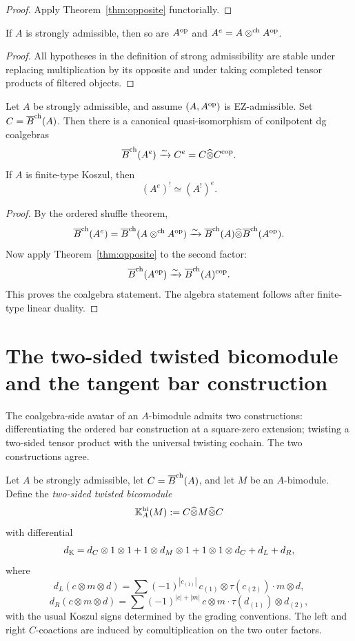 \begin{proof}
Apply Theorem~\ref{thm:opposite} functorially.
\end{proof}

\begin{lemma}
\label{lem:closure}
If $A$ is strongly admissible, then so are $A^{\mathrm{op}}$ and $A^e=A\mathbin{\otimes^{\mathrm{ch}}} A^{\mathrm{op}}$.
\end{lemma}

\begin{proof}
All hypotheses in the definition of strong admissibility are stable under replacing multiplication by
its opposite and under taking completed tensor products of filtered objects.
\end{proof}

\begin{corollary}
\label{cor:enveloping}
Let $A$ be strongly admissible, and assume $(A,A^{\mathrm{op}})$ is EZ-admissible. Set $C=\overline{B}^{\mathrm{ch}}(A)$.
Then there is a canonical quasi-isomorphism of conilpotent dg coalgebras
\[
\overline{B}^{\mathrm{ch}}(A^e)\xrightarrow{\sim} C^e=C\widehat\otimes C^{\mathrm{cop}}.
\]
If $A$ is finite-type Koszul, then
\[
(A^e)^!\simeq (A^!)^e.
\]
\end{corollary}

\begin{proof}
By the ordered shuffle theorem,
\[
\overline{B}^{\mathrm{ch}}(A^e)=\overline{B}^{\mathrm{ch}}(A\mathbin{\otimes^{\mathrm{ch}}} A^{\mathrm{op}})\xrightarrow{\sim}\overline{B}^{\mathrm{ch}}(A)\widehat\otimes \overline{B}^{\mathrm{ch}}(A^{\mathrm{op}}).
\]
Now apply Theorem~\ref{thm:opposite} to the second factor:
\[
\overline{B}^{\mathrm{ch}}(A^{\mathrm{op}})\xrightarrow{\sim}\overline{B}^{\mathrm{ch}}(A)^{\mathrm{cop}}.
\]
This proves the coalgebra statement. The algebra statement follows after finite-type linear duality.
\end{proof}

\section{The two-sided twisted bicomodule and the tangent bar construction}
\label{sec:tangent}

The coalgebra-side avatar of an $A$-bimodule admits two
constructions: differentiating the ordered bar construction at a
square-zero extension; twisting a two-sided tensor product with the
universal twisting cochain. The two constructions agree.

\begin{definition}
\label{def:Kbi}
Let $A$ be strongly admissible, let $C=\overline{B}^{\mathrm{ch}}(A)$, and let $M$ be an $A$-bimodule.
Define the \emph{two-sided twisted bicomodule}
\[
\mathbb{K}_A^{\mathrm{bi}}(M):=C\widehat\otimes M\widehat\otimes C
\]
with differential
\[
d_{\mathbb{K}}
=
d_C\otimes 1\otimes 1 + 1\otimes d_M\otimes 1 + 1\otimes 1\otimes d_C + d_L+d_R,
\]
where
\[
d_L(c\otimes m\otimes d)
=
\sum (-1)^{|c_{(1)}|}\, c_{(1)}\otimes \tau(c_{(2)})\cdot m\otimes d,
\]
\[
d_R(c\otimes m\otimes d)
=
\sum (-1)^{|c|+|m|}\, c\otimes m\cdot \tau(d_{(1)})\otimes d_{(2)},
\]
with the usual Koszul signs determined by the grading conventions.
The left and right $C$-coactions are induced by comultiplication on the two outer factors.
\end{definition}

